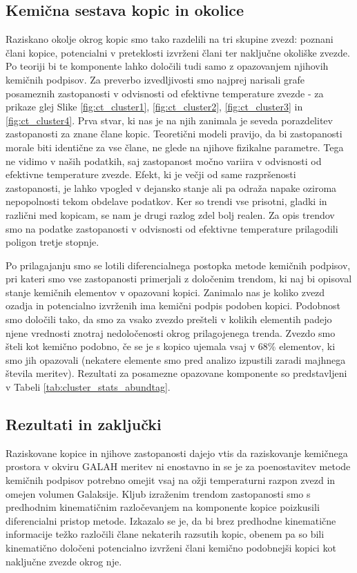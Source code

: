 \subsection{Kemična sestava kopic in okolice}
Raziskano okolje okrog kopic smo tako razdelili na tri skupine zvezd: poznani člani kopice, potencialni v preteklosti izvrženi člani ter naključne okoliške zvezde. Po teoriji bi te komponente lahko določili tudi samo z opazovanjem njihovih kemičnih podpisov. Za preverbo izvedljivosti smo najprej narisali grafe posameznih zastopanosti v odvisnosti od efektivne temperature zvezde - za prikaze glej Slike \ref{fig:ct_cluster1}, \ref{fig:ct_cluster2}, \ref{fig:ct_cluster3} in \ref{fig:ct_cluster4}. Prva stvar, ki nas je na njih zanimala je seveda porazdelitev zastopanosti za znane člane kopic. Teoretični modeli pravijo, da bi zastopanosti morale biti identične za vse člane, ne glede na njihove fizikalne parametre. Tega ne vidimo v naših podatkih, saj zastopanost močno variira v odvisnosti od efektivne temperature zvezde. Efekt, ki je večji od same razpršenosti zastopanosti, je lahko vpogled v dejansko stanje ali pa odraža napake oziroma nepopolnosti tekom obdelave podatkov. Ker so trendi vse prisotni, gladki in različni med kopicam, se nam je drugi razlog zdel bolj realen. Za opis trendov smo na podatke zastopanosti v odvisnosti od efektivne temperature prilagodili poligon tretje stopnje.

Po prilagajanju smo se lotili diferencialnega postopka metode kemičnih podpisov, pri kateri smo vse zastopanosti primerjali z določenim trendom, ki naj bi opisoval stanje kemičnih elementov v opazovani kopici. Zanimalo nas je koliko zvezd ozadja in potencialno izvrženih ima kemični podpis podoben kopici. Podobnost smo določili tako, da smo za vsako zvezdo prešteli v kolikih elementih padejo njene vrednosti znotraj nedoločenosti okrog prilagojenega trenda. Zvezdo smo šteli kot kemično podobno, če se je s kopico ujemala vsaj v $68$\% elementov, ki smo jih opazovali (nekatere elemente smo pred analizo izpustili zaradi majhnega števila meritev). Rezultati za posamezne opazovane komponente so predstavljeni v Tabeli \ref{tab:cluster_stats_abundtag}.

\subsection{Rezultati in zaključki}
Raziskovane kopice in njihove zastopanosti dajejo vtis da raziskovanje kemičnega prostora v okviru GALAH meritev ni enostavno in se je za poenostavitev metode kemičnih podpisov potrebno omejit vsaj na ožji temperaturni razpon zvezd in omejen volumen Galaksije. Kljub izraženim trendom zastopanosti smo s predhodnim kinematičnim razločevanjem na komponente kopice poizkusili diferencialni pristop metode. Izkazalo se je, da bi brez predhodne kinematične informacije težko razločili člane nekaterih razsutih kopic, obenem pa so bili kinematično določeni potencialno izvrženi člani kemično podobnejši kopici kot naključne zvezde okrog nje.

